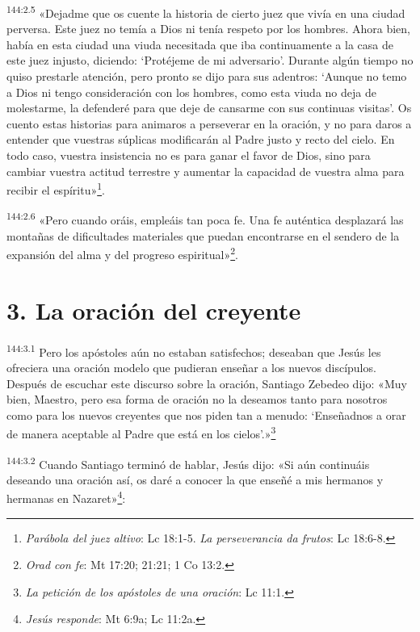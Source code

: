 \par
\textsuperscript{144:2.5} «Dejadme que os cuente la historia de cierto juez que vivía en una ciudad perversa. Este juez no temía a Dios ni tenía respeto por los hombres. Ahora bien, había en esta ciudad una viuda necesitada que iba continuamente a la casa de este juez injusto, diciendo: `Protéjeme de mi adversario'. Durante algún tiempo no quiso prestarle atención, pero pronto se dijo para sus adentros: `Aunque no temo a Dios ni tengo consideración con los hombres, como esta viuda no deja de molestarme, la defenderé para que deje de cansarme con sus continuas visitas'. Os cuento estas historias para animaros a perseverar en la oración, y no para daros a entender que vuestras súplicas modificarán al Padre justo y recto del cielo. En todo caso, vuestra insistencia no es para ganar el favor de Dios, sino para cambiar vuestra actitud terrestre y aumentar la capacidad de vuestra alma para recibir el espíritu»\footnote{\textit{Parábola del juez altivo}: Lc 18:1-5. \textit{La perseverancia da frutos}: Lc 18:6-8.}.

\par
\textsuperscript{144:2.6} «Pero cuando oráis, empleáis tan poca fe. Una fe auténtica desplazará las montañas de dificultades materiales que puedan encontrarse en el sendero de la expansión del alma y del progreso espiritual»\footnote{\textit{Orad con fe}: Mt 17:20; 21:21; 1 Co 13:2.}.

\section*{3. La oración del creyente}
\par
\textsuperscript{144:3.1} Pero los apóstoles aún no estaban satisfechos; deseaban que Jesús les ofreciera una oración modelo que pudieran enseñar a los nuevos discípulos. Después de escuchar este discurso sobre la oración, Santiago Zebedeo dijo: «Muy bien, Maestro, pero esa forma de oración no la deseamos tanto para nosotros como para los nuevos creyentes que nos piden tan a menudo: `Enseñadnos a orar de manera aceptable al Padre que está en los cielos'.»\footnote{\textit{La petición de los apóstoles de una oración}: Lc 11:1.}

\par
\textsuperscript{144:3.2} Cuando Santiago terminó de hablar, Jesús dijo: «Si aún continuáis deseando una oración así, os daré a conocer la que enseñé a mis hermanos y hermanas en Nazaret»\footnote{\textit{Jesús responde}: Mt 6:9a; Lc 11:2a.}:

